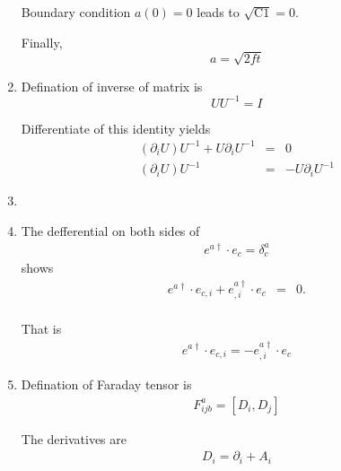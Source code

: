 \documentclass[12pt,a4paper]{article}
\begin{document}
\begin{enumerate}
Boundary condition $a(0)=0$ leads to $\sqrt{\mathrm{C1}} = 0$.

Finally, 
\begin{equation*}
	a = \sqrt{2ft}
\end{equation*}





\item

Defination of inverse of matrix is
\begin{equation*}
	U U^{-1} = I
\end{equation*}

Differentiate of this identity yields
\begin{eqnarray*}
	(\partial_i U)U^{-1} + U \partial_i U^{-1} &=& 0 \\
	(\partial_i U)U^{-1} &=& - U \partial_i U^{-1}
\end{eqnarray*}






\item





\item

The defferential on both sides of
\begin{eqnarray*}
	e^{a\dag}\cdot e_c = \delta^a_c
\end{eqnarray*}
shows
\begin{eqnarray*}
	e^{a\dag}\cdot e_{c,i} + e^{a\dag}_{,i}\cdot e_c &=& 0.  \\
\end{eqnarray*}


That is
\begin{eqnarray*}
	e^{a\dag}\cdot e_{c,i} = - e^{a\dag}_{,i}\cdot e_{c}
\end{eqnarray*}



\item

Defination of Faraday tensor is
\begin{eqnarray*}
	F^a_{ijb} = [D_i,D_j]
\end{eqnarray*}

The derivatives are
\begin{eqnarray*}
	D_i = \partial_i + A_i
\end{eqnarray*}



\end{enumerate}
\end{document}
